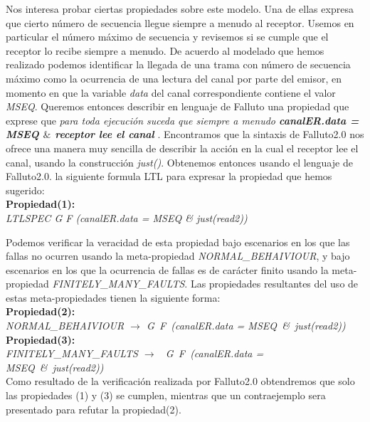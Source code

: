 \documentclass[titlepage, 12pt]{book}
\begin{document}
Nos interesa probar ciertas propiedades sobre este modelo. Una de ellas expresa que cierto número de secuencia llegue siempre a menudo al receptor. Usemos en particular el número máximo de secuencia y revisemos si se cumple que el receptor lo recibe siempre a menudo. De acuerdo al modelado que hemos realizado podemos identificar la llegada de una trama con número de secuencia máximo como la ocurrencia de una lectura del canal por parte del emisor, en momento en que la variable \textit{data} del canal correspondiente contiene el valor \textit{MSEQ}. Queremos entonces describir en lenguaje de Falluto una propiedad que exprese que \textit{para toda ejecución suceda que siempre a menudo \textbf{canalER.data = MSEQ $\&$ receptor lee el canal }}. Encontramos que la sintaxis de Falluto2.0 nos ofrece una manera muy sencilla de describir la acción en la cual el receptor lee el canal, usando la construcción \textit{just()}. Obtenemos entonces usando el lenguaje de Falluto2.0. la siguiente formula LTL para expresar la propiedad que hemos sugerido: \\

\noindent \textbf{Propiedad(1):}\\ \textit{LTLSPEC G F (canalER.data = MSEQ \& just(read2))}

Podemos verificar la veracidad de esta propiedad bajo escenarios en los que las fallas no ocurren usando la meta-propiedad \textit{NORMAL\_BEHAIVIOUR}, y bajo escenarios en los que la ocurrencia de fallas es de carácter finito usando la meta-propiedad \textit{FINITELY\_MANY\_FAULTS}. Las propiedades resultantes del uso de estas meta-propiedades tienen la siguiente forma:\\

\noindent \textbf{Propiedad(2):}\\ \textit{NORMAL\_BEHAIVIOUR $\rightarrow$ G~F~(canalER.data = MSEQ~\&~just(read2))}\\

\noindent \textbf{Propiedad(3):}\\ \textit{FINITELY\_MANY\_FAULTS $\rightarrow$ ~G~F~(canalER.data = MSEQ~\&~just(read2))}\\


Como resultado de la verificación realizada por Falluto2.0 obtendremos que solo las propiedades (1) y (3) se cumplen, mientras que un contraejemplo sera presentado para refutar la propiedad(2). 
\end{document}
